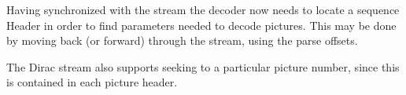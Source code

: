Having synchronized with the stream the decoder now needs to locate a sequence Header in order to find parameters needed to decode pictures. This may be done by moving back (or forward) through the stream, using the parse offsets.

The Dirac stream also supports seeking to a particular picture number, since this
is contained in each picture header.

